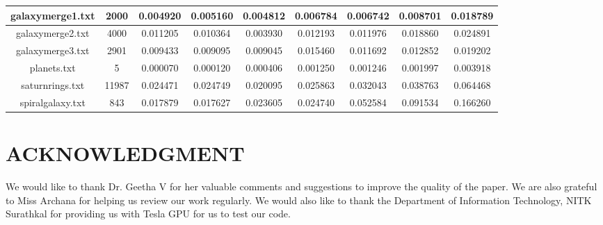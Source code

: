 \documentclass[letterpaper, 10 pt, conference]{ieeeconf}
\begin{document}
\begin{table*}[h]
\begin{center}
\begin{tabular}{|c||c||c||c||c||c||c||c||c|}
galaxymerge1.txt & 2000 & 0.004920 & 0.005160 & 0.004812 & 0.006784 & 0.006742 & 0.008701 & 0.018789 \\
\hline
galaxymerge2.txt & 4000 & 0.011205 & 0.010364 & 0.003930 & 0.012193 & 0.011976 & 0.018860 & 0.024891 \\
\hline
galaxymerge3.txt & 2901 & 0.009433 & 0.009095 & 0.009045 & 0.015460 & 0.011692 & 0.012852 & 0.019202 \\
\hline
planets.txt & 5 & 0.000070 & 0.000120 & 0.000406 & 0.001250 & 0.001246 & 0.001997 & 0.003918 \\
\hline
saturnrings.txt & 11987 & 0.024471 & 0.024749 & 0.020095 & 0.025863 & 0.032043 & 0.038763 & 0.064468 \\
\hline
spiralgalaxy.txt & 843 & 0.017879 & 0.017627 & 0.023605 & 0.024740 & 0.052584 & 0.091534 & 0.166260 \\
\hline
\end{tabular}
\end{center}
\end{table*}

\section*{ACKNOWLEDGMENT}

We would like to thank Dr. Geetha V for her valuable comments and suggestions to improve the
quality of the paper. We are also grateful to Miss Archana for helping us review our work regularly. We would also like to thank the Department of Information Technology, NITK Surathkal for providing us with Tesla GPU for us to test our code.


\end{document}
